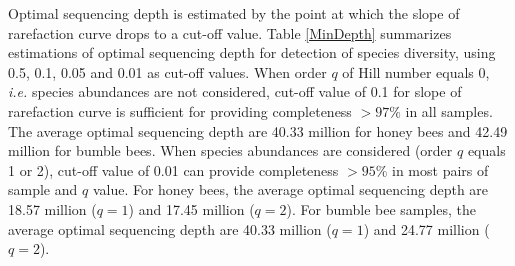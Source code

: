 \documentclass[11pt]{article}
\begin{document}

    Optimal sequencing depth is estimated by the point at which the slope of rarefaction curve drops to a cut-off value. 
    Table \ref{MinDepth} summarizes estimations of optimal sequencing depth for detection of species diversity, using 0.5, 0.1, 0.05 and 0.01 as cut-off values.  
    When order $q$ of Hill number equals 0, \textit{i.e.} species abundances are not considered, cut-off value of 0.1 for slope of rarefaction curve is sufficient for providing completeness $> 97\%$ in all samples. 
    The average optimal sequencing depth are 40.33 million for honey bees and 42.49 million for bumble bees. 
    When species abundances are considered (order $q$ equals 1 or 2), cut-off value of 0.01 can provide completeness $> 95\%$ in most pairs of sample and $q$ value. 
    For honey bees, the average optimal sequencing depth are 18.57 million ($q = 1$) and 17.45 million ($q = 2$). 
    For bumble bee samples, the average optimal sequencing depth are 40.33 million ($q = 1$) and 24.77 million ($q = 2$). 
\end{document}
